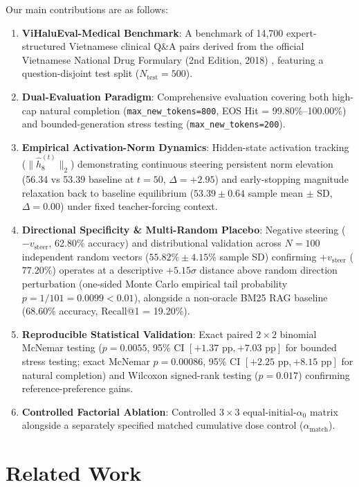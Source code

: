 \documentclass[conference]{IEEEtran}
\begin{document}
Our main contributions are as follows:
\begin{enumerate}
    \item \textbf{ViHaluEval-Medical Benchmark}: A benchmark of 14,700 expert-structured Vietnamese clinical Q\&A pairs derived from the official Vietnamese National Drug Formulary (2nd Edition, 2018) \cite{ref6}, featuring a question-disjoint test split ($N_{\text{test}}=500$).
    \item \textbf{Dual-Evaluation Paradigm}: Comprehensive evaluation covering both high-cap natural completion (\texttt{max\_new\_tokens=800}, EOS Hit = 99.80\%--100.00\%) and bounded-generation stress testing (\texttt{max\_new\_tokens=200}).
    \item \textbf{Empirical Activation-Norm Dynamics}: Hidden-state activation tracking ($\|\hat{h}_8^{(t)}\|_2$) demonstrating continuous steering persistent norm elevation (56.34 vs 53.39 baseline at $t=50$, $\Delta = +2.95$) and early-stopping magnitude relaxation back to baseline equilibrium ($53.39 \pm 0.64$ sample mean $\pm$ SD, $\Delta = 0.00$) under fixed teacher-forcing context.
    \item \textbf{Directional Specificity \& Multi-Random Placebo}: Negative steering ($-v_{\text{steer}}$, 62.80\% accuracy) and distributional validation across $N=100$ independent random vectors ($55.82\% \pm 4.15\%$ sample SD) confirming $+v_{\text{steer}}$ ($77.20\%$) operates at a descriptive $+5.15\sigma$ distance above random direction perturbation (one-sided Monte Carlo empirical tail probability $p=1/101=0.0099 < 0.01$), alongside a non-oracle BM25 RAG baseline (68.60\% accuracy, Recall@1 = 19.20\%).
    \item \textbf{Reproducible Statistical Validation}: Exact paired $2\times 2$ binomial McNemar testing ($p=0.0055$, 95\% CI $[+1.37\text{ pp}, +7.03\text{ pp}]$ for bounded stress testing; exact McNemar $p=0.00086$, 95\% CI $[+2.25\text{ pp}, +8.15\text{ pp}]$ for natural completion) and Wilcoxon signed-rank testing ($p=0.017$) confirming reference-preference gains.
    \item \textbf{Controlled Factorial Ablation}: Controlled $3\times 3$ equal-initial-$\alpha_0$ matrix alongside a separately specified matched cumulative dose control ($\alpha_{\text{match}}$).
\end{enumerate}

\section{Related Work}
\end{document}
